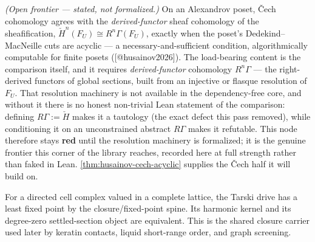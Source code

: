 \begin{theorem}[Husainov: \v{C}ech $=$ derived-functor cohomology]\label{thm:husainov-cech-derived}\notready{}
\emph{(Open frontier --- stated, not formalized.)} On an Alexandrov poset, \v{C}ech cohomology
agrees with the \emph{derived-functor} sheaf cohomology of the sheafification,
$\check{H}^n(F_U) \cong R^n\Gamma(F_U)$, exactly when the poset's Dedekind--MacNeille cuts are
acyclic --- a necessary-and-sufficient condition, algorithmically computable for finite posets
([@husainov2026]). The load-bearing content is the comparison itself, and it requires
\emph{derived-functor} cohomology $R^n\Gamma$ --- the right-derived functors of global sections,
built from an injective or flasque resolution of $F_U$. That resolution machinery is not
available in the dependency-free core, and without it there is no honest non-trivial Lean
statement of the comparison: defining $R\Gamma := \check{H}$ makes it a tautology (the exact
defect this pass removed), while conditioning it on an unconstrained abstract $R\Gamma$ makes it
refutable. This node therefore stays \textbf{red} until the resolution machinery is formalized;
it is the genuine frontier this corner of the library reaches, recorded here at full strength
rather than faked in Lean. \cref{thm:husainov-cech-acyclic} supplies the \v{C}ech half it will
build on.
\end{theorem}

\begin{theorem}\label{thm:tarski-sheaf-closure}\leanok{}
For a directed cell complex valued in a complete lattice, the Tarski drive has a
least fixed point by the closure/fixed-point spine. Its harmonic kernel and its
degree-zero settled-section object are equivalent. This is the shared closure
carrier used later by keratin contacts, liquid short-range order, and graph
screening.
\end{theorem}
